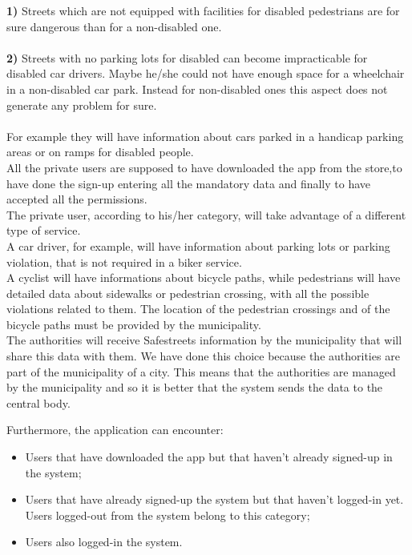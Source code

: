 \documentclass[titlepage]{article}
\begin{document}
\textbf{1)} Streets which are not equipped with facilities for disabled pedestrians are for sure dangerous than for a non-disabled one.\\ \\
\textbf{2)} Streets with no parking lots for disabled can become impracticable for disabled car drivers. Maybe he/she could not have enough space for a wheelchair in a non-disabled car park. Instead for non-disabled ones this aspect does not generate any problem for sure. \\ \\
For example they will have information about cars parked in a handicap parking areas or on ramps for disabled people.\\
All the private users are supposed to have downloaded the app from the store,to have done the sign-up entering all the mandatory data and finally to have accepted all the permissions.\\
The private user, according to his/her category, will take advantage of a different type of service.\\
A car driver, for example, will have information about parking lots or parking violation, that is not required in a biker service.\\
A cyclist will have informations about bicycle paths, while pedestrians will have detailed data about sidewalks or pedestrian crossing, with all the possible violations related to them. The location of the pedestrian crossings and of the bicycle paths must be provided by the municipality.  \\
The authorities will receive Safestreets information by the municipality that will share this data with them. We have done this choice because the authorities are part of the municipality of a city. This means that the authorities are managed by the municipality and so it is better that the system sends the data to the central body.

Furthermore, the application can encounter:
\begin{itemize}
	\item Users that have downloaded the app but that haven't already signed-up in the system;
	\item Users that have already signed-up the system but that haven't logged-in yet. Users logged-out from the system belong to this category;
	\item Users also logged-in the system.\\
	
\end{itemize}
\end{document}
